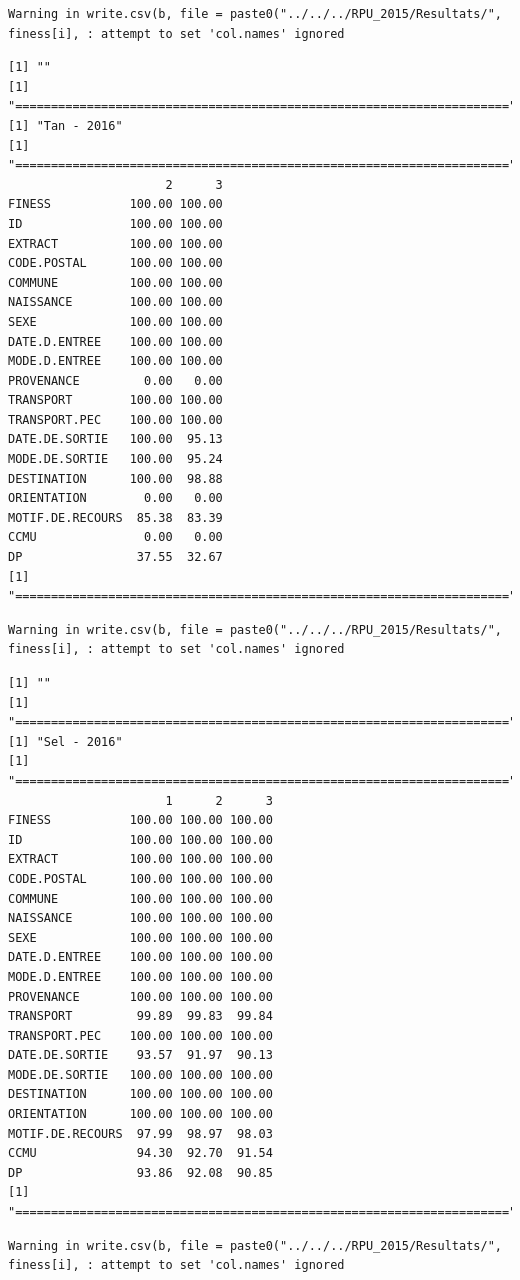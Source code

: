 \documentclass[]{article}
\begin{document}
\begin{verbatim}
Warning in write.csv(b, file = paste0("../../../RPU_2015/Resultats/",
finess[i], : attempt to set 'col.names' ignored
\end{verbatim}

\begin{verbatim}
[1] ""
[1] "====================================================================="
[1] "Tan - 2016"
[1] "====================================================================="
                      2      3
FINESS           100.00 100.00
ID               100.00 100.00
EXTRACT          100.00 100.00
CODE.POSTAL      100.00 100.00
COMMUNE          100.00 100.00
NAISSANCE        100.00 100.00
SEXE             100.00 100.00
DATE.D.ENTREE    100.00 100.00
MODE.D.ENTREE    100.00 100.00
PROVENANCE         0.00   0.00
TRANSPORT        100.00 100.00
TRANSPORT.PEC    100.00 100.00
DATE.DE.SORTIE   100.00  95.13
MODE.DE.SORTIE   100.00  95.24
DESTINATION      100.00  98.88
ORIENTATION        0.00   0.00
MOTIF.DE.RECOURS  85.38  83.39
CCMU               0.00   0.00
DP                37.55  32.67
[1] "====================================================================="
\end{verbatim}

\begin{verbatim}
Warning in write.csv(b, file = paste0("../../../RPU_2015/Resultats/",
finess[i], : attempt to set 'col.names' ignored
\end{verbatim}

\begin{verbatim}
[1] ""
[1] "====================================================================="
[1] "Sel - 2016"
[1] "====================================================================="
                      1      2      3
FINESS           100.00 100.00 100.00
ID               100.00 100.00 100.00
EXTRACT          100.00 100.00 100.00
CODE.POSTAL      100.00 100.00 100.00
COMMUNE          100.00 100.00 100.00
NAISSANCE        100.00 100.00 100.00
SEXE             100.00 100.00 100.00
DATE.D.ENTREE    100.00 100.00 100.00
MODE.D.ENTREE    100.00 100.00 100.00
PROVENANCE       100.00 100.00 100.00
TRANSPORT         99.89  99.83  99.84
TRANSPORT.PEC    100.00 100.00 100.00
DATE.DE.SORTIE    93.57  91.97  90.13
MODE.DE.SORTIE   100.00 100.00 100.00
DESTINATION      100.00 100.00 100.00
ORIENTATION      100.00 100.00 100.00
MOTIF.DE.RECOURS  97.99  98.97  98.03
CCMU              94.30  92.70  91.54
DP                93.86  92.08  90.85
[1] "====================================================================="
\end{verbatim}

\begin{verbatim}
Warning in write.csv(b, file = paste0("../../../RPU_2015/Resultats/",
finess[i], : attempt to set 'col.names' ignored
\end{verbatim}
\end{document}
